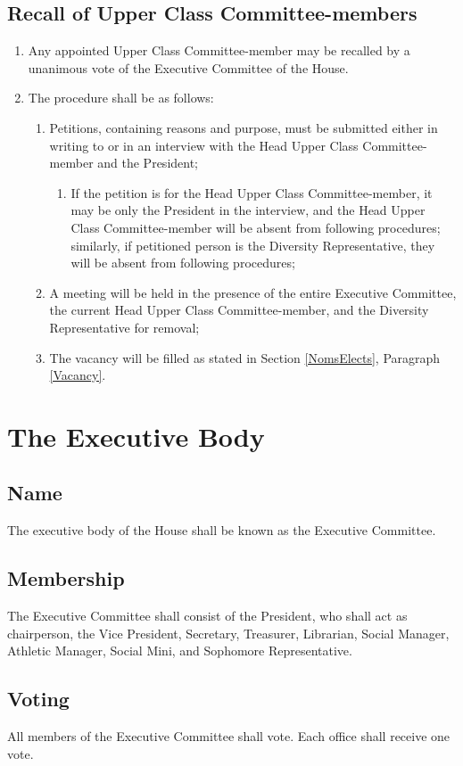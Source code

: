 \documentclass[10pt]{article} %
\begin{document}
\subsection{Recall of Upper Class Committee-members}
\begin{enumerate}
\item Any appointed Upper Class Committee-member may be recalled by a unanimous vote of the Executive Committee of the House. 
\item The procedure shall be as follows:
\begin{enumerate}
\item Petitions, containing reasons and purpose, must be submitted either in writing to or in an interview with the Head Upper Class Committee-member and the President;
\begin{enumerate}
	\item If the petition is for the Head Upper Class Committee-member, it may be only the President in the interview, and the Head Upper Class Committee-member will be absent from following procedures; similarly, if petitioned person is the Diversity Representative, they will be absent from following procedures;
\end{enumerate}
\item A meeting will be held in the presence of the entire Executive Committee, the current Head Upper Class Committee-member, and the Diversity Representative for removal;
\item The vacancy will be filled as stated in Section \ref{NomsElects}, Paragraph \ref{Vacancy}.
\end{enumerate}
\end{enumerate}
\section{The Executive Body}
\subsection{Name}
The executive body of the House shall be known as the Executive Committee.
\subsection{Membership}
The Executive Committee shall consist of the President, who shall act as chairperson, the Vice President, Secretary, Treasurer, Librarian, Social Manager, Athletic Manager, Social Mini, and Sophomore Representative.
\subsection{Voting}
All members of the Executive Committee shall vote. Each office shall receive one vote.
\end{document}
